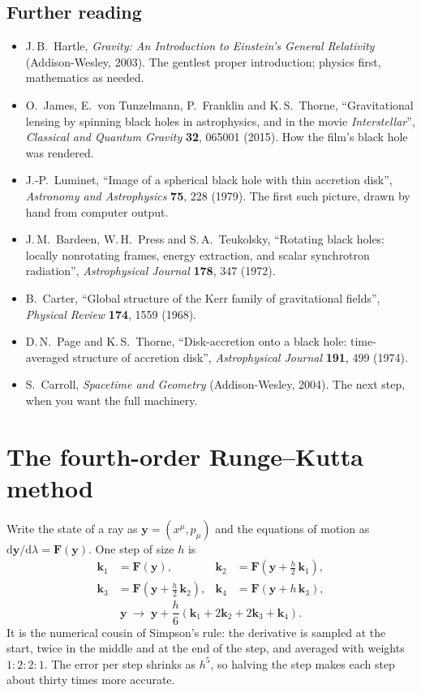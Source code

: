 \documentclass[11pt,a4paper]{article}
\newcommand{\dd}{\mathrm{d}}
\newcommand{\vect}[1]{\mathbf{#1}}
\begin{document}
\subsection*{Further reading}
\begin{itemize}
  \item J.\,B.~Hartle, \emph{Gravity: An Introduction to Einstein's General Relativity}
        (Addison-Wesley, 2003). The gentlest proper introduction; physics first,
        mathematics as needed.
  \item O.~James, E.~von Tunzelmann, P.~Franklin and K.\,S.~Thorne, ``Gravitational
        lensing by spinning black holes in astrophysics, and in the movie
        \emph{Interstellar}'', \emph{Classical and Quantum Gravity} \textbf{32}, 065001
        (2015). How the film's black hole was rendered.
  \item J.-P.~Luminet, ``Image of a spherical black hole with thin accretion disk'',
        \emph{Astronomy and Astrophysics} \textbf{75}, 228 (1979). The first such picture,
        drawn by hand from computer output.
  \item J.\,M.~Bardeen, W.\,H.~Press and S.\,A.~Teukolsky, ``Rotating black holes:
        locally nonrotating frames, energy extraction, and scalar synchrotron radiation'',
        \emph{Astrophysical Journal} \textbf{178}, 347 (1972).
  \item B.~Carter, ``Global structure of the Kerr family of gravitational fields'',
        \emph{Physical Review} \textbf{174}, 1559 (1968).
  \item D.\,N.~Page and K.\,S.~Thorne, ``Disk-accretion onto a black hole: time-averaged
        structure of accretion disk'', \emph{Astrophysical Journal} \textbf{191}, 499
        (1974).
  \item S.~Carroll, \emph{Spacetime and Geometry} (Addison-Wesley, 2004). The next step,
        when you want the full machinery.
\end{itemize}

\appendix
\section{The fourth-order Runge--Kutta method}\label{app:rk4}

Write the state of a ray as $\vect y = (x^\mu, p_\mu)$ and the equations of motion as
$\dd\vect y/\dd\lambda = \vect F(\vect y)$. One step of size $h$ is
\begin{align*}
  \vect k_1 &= \vect F(\vect y), &
  \vect k_2 &= \vect F\!\left(\vect y + \tfrac h2\, \vect k_1\right),\\
  \vect k_3 &= \vect F\!\left(\vect y + \tfrac h2\, \vect k_2\right), &
  \vect k_4 &= \vect F(\vect y + h\, \vect k_3),
\end{align*}
\[
  \vect y \;\to\; \vect y + \frac h6\left(\vect k_1 + 2\vect k_2 + 2\vect k_3 + \vect k_4\right).
\]
It is the numerical cousin of Simpson's rule: the derivative is sampled at the start, twice
in the middle and at the end of the step, and averaged with weights $1{:}2{:}2{:}1$. The
error per step shrinks as $h^5$, so halving the step makes each step about thirty times
more accurate.
\end{document}
